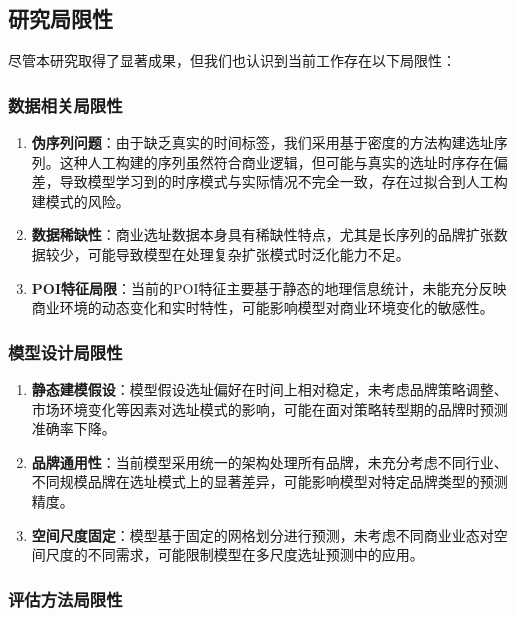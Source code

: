 \documentclass{article}
\begin{document}
\subsection{研究局限性}

尽管本研究取得了显著成果，但我们也认识到当前工作存在以下局限性：

\subsubsection{数据相关局限性}

\begin{enumerate}
\item \textbf{伪序列问题}：由于缺乏真实的时间标签，我们采用基于密度的方法构建选址序列。这种人工构建的序列虽然符合商业逻辑，但可能与真实的选址时序存在偏差，导致模型学习到的时序模式与实际情况不完全一致，存在过拟合到人工构建模式的风险。

\item \textbf{数据稀缺性}：商业选址数据本身具有稀缺性特点，尤其是长序列的品牌扩张数据较少，可能导致模型在处理复杂扩张模式时泛化能力不足。

\item \textbf{POI特征局限}：当前的POI特征主要基于静态的地理信息统计，未能充分反映商业环境的动态变化和实时特性，可能影响模型对商业环境变化的敏感性。
\end{enumerate}

\subsubsection{模型设计局限性}

\begin{enumerate}
\item \textbf{静态建模假设}：模型假设选址偏好在时间上相对稳定，未考虑品牌策略调整、市场环境变化等因素对选址模式的影响，可能在面对策略转型期的品牌时预测准确率下降。

\item \textbf{品牌通用性}：当前模型采用统一的架构处理所有品牌，未充分考虑不同行业、不同规模品牌在选址模式上的显著差异，可能影响模型对特定品牌类型的预测精度。

\item \textbf{空间尺度固定}：模型基于固定的网格划分进行预测，未考虑不同商业业态对空间尺度的不同需求，可能限制模型在多尺度选址预测中的应用。
\end{enumerate}

\subsubsection{评估方法局限性}
\end{document}
